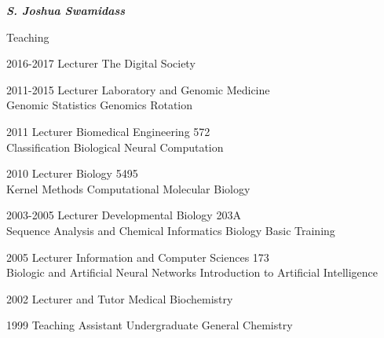 \documentclass[10pt]{article}
\begin{document}
\begin{cv}{\huge \it \bfseries S. Joshua Swamidass}
\begin{cvlist}{Teaching }
\item[2016-2017] Lecturer \hfill   The Digital Society
\item[2011-2015] Lecturer \hfill Laboratory and Genomic Medicine \\ Genomic Statistics  \hfill Genomics Rotation
\item[2011] Lecturer \hfill Biomedical Engineering 572\\ Classification \hfill Biological Neural Computation
\item[2010] Lecturer \hfill Biology 5495\\ Kernel Methods \hfill Computational Molecular Biology
\item[2003-2005] Lecturer \hfill Developmental Biology 203A \\ Sequence Analysis and Chemical Informatics \hfill Biology Basic Training
\item[2005] Lecturer  \hfill Information and Computer Sciences 173 \\ Biologic and 
Artificial Neural Networks \hfill Introduction to Artificial Intelligence
\item[2002] Lecturer and Tutor \hfill Medical Biochemistry 
\item[1999] Teaching Assistant  \hfill Undergraduate General Chemistry 
\end{cvlist}



\iffalse
\begin{cvlist}{Technical Skills }
\item Designing and applying algorithms in statistical machine learning, data mining, and artiﬁcial intelligence, including neural networks, support vector machines, hidden-markov models, bayesian networks, bayesian inference, and multivariate statistics. Proficient in Python, C, C++, Swig, 
SciPy, SQL, Java, and several additional languages. 
\end{cvlist}
\fi

\end{cv}
\end{document}
